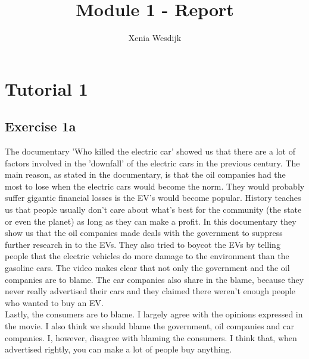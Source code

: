 \documentclass[final]{scrreprt} %
\title{Module 1 - Report}
\author{Xenia {Wesdijk}}
\begin{document}

\chapter{Tutorial 1}
\section{Exercise 1a} 
The documentary 'Who killed the electric car' showed us that there are a lot of factors involved in the 'downfall' of the electric cars in the previous century. The main reason, as stated in the documentary, is that the oil companies had the most to lose when the electric cars would become the norm. They would probably suffer gigantic financial losses is the EV's would become popular. History teaches us that people usually don't care about what's best for the community (the state or even the planet) as long as they can make a profit. In this documentary they show us that the oil companies made deals with the government to suppress further research in to the EVs. They also tried to boycot the EVs by telling people that the electric vehicles do more damage to the environment than the gasoline cars. 
The video makes clear that not only the government and the oil companies are to blame. The car companies also share in the blame, because they never really advertised their cars and they claimed there weren't enough people who wanted to buy an EV. \\
Lastly, the consumers are to blame. 
I largely agree with the opinions expressed in the movie. I also think we should blame the government, oil companies and car companies. I, however, disagree with blaming the consumers. I think that, when advertised rightly, you can make a lot of people buy anything.
\end{document}
